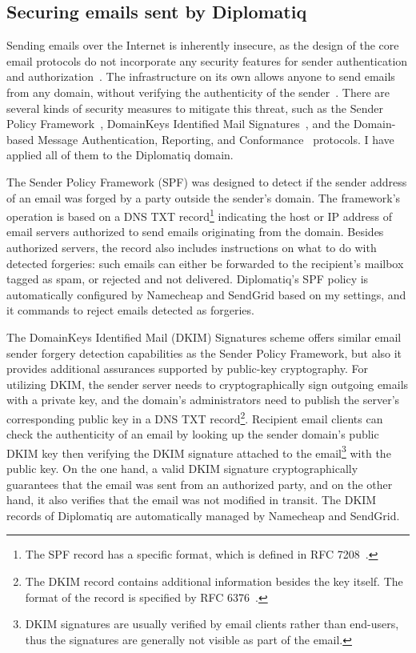\subsection{Securing emails sent by Diplomatiq}

Sending emails over the Internet is inherently insecure, as the design of the core email protocols do not incorporate any security features for sender authentication and authorization~\cite{foster2015security}. The infrastructure on its own allows anyone to send emails from any domain, without verifying the authenticity of the sender~\cite{rfc5321}. There are several kinds of security measures to mitigate this threat, such as the Sender Policy Framework~\cite{rfc7208}, DomainKeys Identified Mail Signatures~\cite{rfc6376}, and the Domain-based Message Authentication, Reporting, and Conformance~\cite{rfc7489} protocols. I have applied all of them to the Diplomatiq domain.

The Sender Policy Framework (SPF) was designed to detect if the sender address of an email was forged by a party outside the sender's domain. The framework's operation is based on a DNS TXT record\footnote{The SPF record has a specific format, which is defined in RFC 7208~\cite{rfc7208}.} indicating the host or IP address of email servers authorized to send emails originating from the domain. Besides authorized servers, the record also includes instructions on what to do with detected forgeries: such emails can either be forwarded to the recipient's mailbox tagged as spam, or rejected and not delivered. Diplomatiq's SPF policy is automatically configured by Namecheap and SendGrid based on my settings, and it commands to reject emails detected as forgeries.

The DomainKeys Identified Mail (DKIM) Signatures scheme offers similar email sender forgery detection capabilities as the Sender Policy Framework, but also it provides additional assurances supported by public-key cryptography. For utilizing DKIM, the sender server needs to cryptographically sign outgoing emails with a private key, and the domain's administrators need to publish the server's corresponding public key in a DNS TXT record\footnote{The DKIM record contains additional information besides the key itself. The format of the record is specified by RFC 6376~\cite{rfc6376}.}. Recipient email clients can check the authenticity of an email by looking up the sender domain's public DKIM key then verifying the DKIM signature attached to the email\footnote{DKIM signatures are usually verified by email clients rather than end-users, thus the signatures are generally not visible as part of the email.} with the public key. On the one hand, a valid DKIM signature cryptographically guarantees that the email was sent from an authorized party, and on the other hand, it also verifies that the email was not modified in transit. The DKIM records of Diplomatiq are automatically managed by Namecheap and SendGrid.

